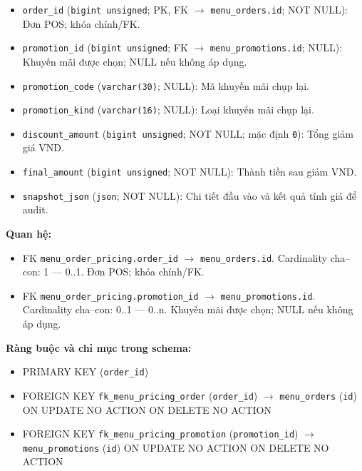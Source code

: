 \begin{itemize}

\item \texttt{order\_id} (\texttt{bigint unsigned}; PK, FK $\rightarrow$ \texttt{menu\_orders.id}; NOT NULL): Đơn POS; khóa chính/FK.

\item \texttt{promotion\_id} (\texttt{bigint unsigned}; FK $\rightarrow$ \texttt{menu\_promotions.id}; NULL): Khuyến mãi được chọn; NULL nếu không áp dụng.

\item \texttt{promotion\_code} (\texttt{varchar(30)}; NULL): Mã khuyến mãi chụp lại.

\item \texttt{promotion\_kind} (\texttt{varchar(16)}; NULL): Loại khuyến mãi chụp lại.

\item \texttt{discount\_amount} (\texttt{bigint unsigned}; NOT NULL; mặc định \texttt{0}): Tổng giảm giá VND.

\item \texttt{final\_amount} (\texttt{bigint unsigned}; NOT NULL): Thành tiền sau giảm VND.

\item \texttt{snapshot\_json} (\texttt{json}; NOT NULL): Chi tiết đầu vào và kết quả tính giá để audit.

\end{itemize}

\textbf{Quan hệ:}

\begin{itemize}

\item FK \texttt{menu\_order\_pricing.order\_id} $\rightarrow$ \texttt{menu\_orders.id}. Cardinality cha--con: 1 — 0..1. Đơn POS; khóa chính/FK.

\item FK \texttt{menu\_order\_pricing.promotion\_id} $\rightarrow$ \texttt{menu\_promotions.id}. Cardinality cha--con: 0..1 — 0..n. Khuyến mãi được chọn; NULL nếu không áp dụng.

\end{itemize}

\textbf{Ràng buộc và chỉ mục trong schema:}

\begin{itemize}

\item PRIMARY KEY (\texttt{order\_id})

\item FOREIGN KEY \texttt{fk\_menu\_pricing\_order} (\texttt{order\_id}) $\rightarrow$ \texttt{menu\_orders} (\texttt{id}) ON UPDATE NO ACTION ON DELETE NO ACTION

\item FOREIGN KEY \texttt{fk\_menu\_pricing\_promotion} (\texttt{promotion\_id}) $\rightarrow$ \texttt{menu\_promotions} (\texttt{id}) ON UPDATE NO ACTION ON DELETE NO ACTION

\end{itemize}

